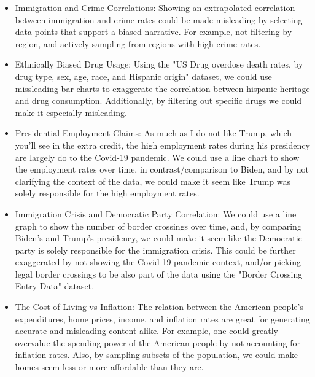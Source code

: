 \documentclass{article}
\begin{document}
\begin{itemize}
  \item Immigration and Crime Correlations: 
  Showing an extrapolated correlation between immigration and crime rates 
  could be made misleading by selecting data points that support a biased narrative.
  For example, not filtering by region, and actively sampling from regions with high crime rates.

  \item Ethnically Biased Drug Usage: 
  Using the "US Drug overdose death rates, by drug type, sex, age, race, and Hispanic origin" 
  \cite{drugOverdoseDeathRates} dataset, we could use missleading bar charts to exaggerate the 
  correlation between hispanic heritage and drug consumption. Additionally, by 
  filtering out specific drugs we could make it especially misleading.

  \item Presidential Employment Claims:
  As much as I do not like Trump, which you'll see in the extra credit,
  the high employment rates during his presidency are largely do to the Covid-19 pandemic.
  We could use a line chart to show the employment rates over time, in contrast/comparison to Biden, 
  and by not clarifying the context of the data, we could make it seem like Trump 
  was solely responsible for the high employment rates.

  \item Immigration Crisis and Democratic Party Correlation:
  We could use a line graph to show the number of border crossings over time, and, by comparing
  Biden's and Trump's presidency, we could make it seem like the Democratic party is solely 
  responsible for the immigration crisis. This could be further exaggerated by not showing the
  Covid-19 pandemic context, and/or picking legal border crossings to be also part of the data using
  the "Border Crossing Entry Data" \cite{borderCrossingEntryData} dataset. 
  
  \item The Cost of Living vs Inflation: 
  The relation between the American people's expenditures, home prices, income, and inflation rates
  are great for generating accurate and misleading content alike. For example, one could
  greatly overvalue the spending power of the American people by not accounting for inflation rates.
  Also, by sampling subsets of the population, we could make homes seem less or more affordable than they are.
\end{itemize}
\end{document}
